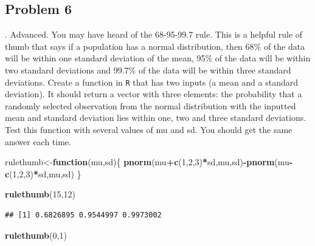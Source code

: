 \documentclass[
]{book}
\newenvironment{Shaded}{\begin{snugshade}}{\end{snugshade}}
\newcommand{\ControlFlowTok}[1]{\textcolor[rgb]{0.13,0.29,0.53}{\textbf{#1}}}
\newcommand{\DecValTok}[1]{\textcolor[rgb]{0.00,0.00,0.81}{#1}}
\newcommand{\KeywordTok}[1]{\textcolor[rgb]{0.13,0.29,0.53}{\textbf{#1}}}
\newcommand{\NormalTok}[1]{#1}
\newcommand{\OperatorTok}[1]{\textcolor[rgb]{0.81,0.36,0.00}{\textbf{#1}}}
\begin{document}
\newpage

\hypertarget{problem-6-2}{%
\subsection{Problem 6}\label{problem-6-2}}

. Advanced. You may have heard of the 68-95-99.7 rule. This is a helpful rule of thumb that says if a population has a normal distribution, then 68\% of the data will be within one standard deviation of the mean, 95\% of the data will be within two standard deviations and 99.7\% of the data will be within three standard deviations. Create a function in \texttt{R} that has two inputs (a mean and a standard deviation). It should return a vector with three elements: the probability that a randomly selected observation from the normal distribution with the inputted mean and standard deviation lies within one, two and three standard deviations. Test this function with several values of mu and sd. You should get the same answer each time.

\begin{Shaded}
\begin{Highlighting}[]
\NormalTok{rulethumb<-}\ControlFlowTok{function}\NormalTok{(mu,sd)\{}
  \KeywordTok{pnorm}\NormalTok{(mu}\OperatorTok{+}\KeywordTok{c}\NormalTok{(}\DecValTok{1}\NormalTok{,}\DecValTok{2}\NormalTok{,}\DecValTok{3}\NormalTok{)}\OperatorTok{*}\NormalTok{sd,mu,sd)}\OperatorTok{-}\KeywordTok{pnorm}\NormalTok{(mu}\OperatorTok{-}\KeywordTok{c}\NormalTok{(}\DecValTok{1}\NormalTok{,}\DecValTok{2}\NormalTok{,}\DecValTok{3}\NormalTok{)}\OperatorTok{*}\NormalTok{sd,mu,sd)}
\NormalTok{\}}
\end{Highlighting}
\end{Shaded}

\begin{Shaded}
\begin{Highlighting}[]
\KeywordTok{rulethumb}\NormalTok{(}\DecValTok{15}\NormalTok{,}\DecValTok{12}\NormalTok{)}
\end{Highlighting}
\end{Shaded}

\begin{verbatim}
## [1] 0.6826895 0.9544997 0.9973002
\end{verbatim}

\begin{Shaded}
\begin{Highlighting}[]
\KeywordTok{rulethumb}\NormalTok{(}\DecValTok{0}\NormalTok{,}\DecValTok{1}\NormalTok{)}
\end{Highlighting}
\end{Shaded}
\end{document}

